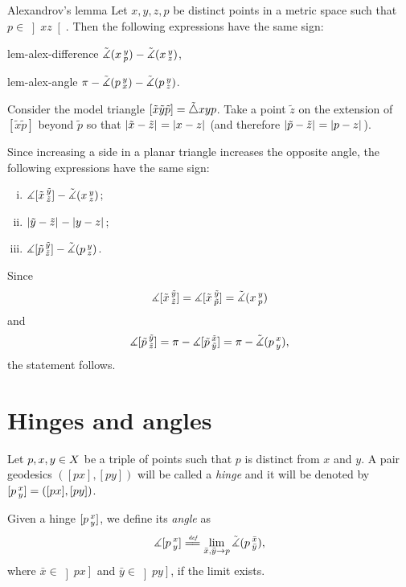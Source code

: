 \begin{thm}{Alexandrov's lemma}
\label{lem:alex}  
Let $x,y,z,p$ be distinct points in a metric space such that $p\in \left]x z\right[$.
Then the following expressions have the same sign:
\begin{subthm}{lem-alex-difference}
$\angk0 x y p
-\angk0 x y z$,
\end{subthm} 

\begin{subthm}{lem-alex-angle}
$\pi - \angk0 p y x
-\angk0 p y z$.
\end{subthm}

\end{thm}

Consider the model triangle $\trig{\tilde x}{\tilde y}{\tilde p}=\modtrig0 x y p$.
Take 
a point $\tilde z$ on the extension of 
$[\tilde x \tilde p]$ beyond $\tilde p$ so that $\dist{\tilde x}{\tilde z}{}=\dist{x}{z}{}$ (and therefore $\dist{\tilde p}{\tilde z}{}=\dist{p}{z}{}$). 
 
Since increasing a side in a planar triangle increases the opposite angle, 
the following expressions have the same sign:
\begin{enumerate}[(i)]
\item $\mangle\hinge{\tilde x}{\tilde y}{\tilde z}-\angk0{x}{y}{z}$;
\item $\dist{\tilde y}{\tilde z}{}-\dist{y}{z}{}$;
\item $\mangle\hinge{\tilde p}{\tilde y}{\tilde z}-\angk0{p}{y}{z}$.
\end{enumerate}
Since 
\[\mangle\hinge{\tilde x}{\tilde y}{\tilde z}=\mangle\hinge{\tilde x}{\tilde y}{\tilde p}=\angk0{x}{y}{p}\]
and
\[ \mangle\hinge{\tilde p}{\tilde y}{\tilde z}
=\pi-\mangle\hinge{\tilde p}{\tilde x}{\tilde y}
=\pi-\angk0{p}{x}{y},\]
the statement follows.
\qeds


\section{Hinges and angles}

Let $p,x,y\in \spc{X}$ be a triple of points such that $p$ is distinct from $x$ and $y$.
A pair geodesics $([p x],[p y])$ will be called a \emph{hinge} and it will be denoted by 
$\hinge p x y=([p x],[p y])$\index{$\hinge{{*}}{{*}}{{*}}$}.


Given a hinge $\hinge p x y$, we define its \emph{angle} as 
\index{$\mangle$!$\mangle\hinge{{*}}{{*}}{{*}}$}
\[\mangle\hinge p x y
\df
\lim_{\bar x,\bar y\to p} \angk0 p{\bar x}{\bar y},\]
where $\bar x\in\left ]p x\right]$ and $\bar y\in\left]p y\right]$, if the limit exists.

